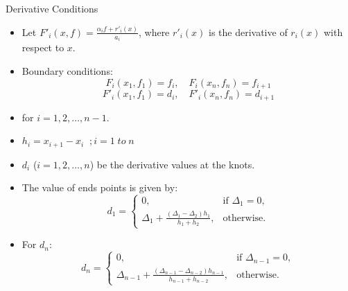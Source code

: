 \documentclass{beamer}
\begin{document}
\begin{frame}{Derivative Conditions}
    \begin{itemize}
        \item Let \( F'_i(x, f) = \frac{\alpha_i f + r'_i(x)}{a_i} \), where \( r'_i(x) \) is the derivative of \( r_i(x) \) with respect to \( x \).
        \item Boundary conditions:
        \[
        F_i(x_1, f_1) = f_i, \quad F_i(x_n, f_n) = f_{i+1}
        \]
        \[
        F'_i(x_1, f_1) = d_i, \quad F'_i(x_n, f_n) = d_{i+1}
        \]
        \item for \( i = 1, 2, \ldots, n - 1 \).
        \item \(h_i=x_{i+1}-x_i\;\;;i=1\;to\; n\)
        \item  \( d_i \) (\(i = 1, 2, \ldots, n\)) be the derivative values at the knots.
    \end{itemize}
    
        \begin{itemize}
        \item The value of ends points is given by:
        \[
        d_1 =
        \begin{cases}
            0, & \text{if } \Delta_1 = 0, \\
            \Delta_1 + \frac{(\Delta_1 - \Delta_2) h_1}{h_1 + h_2}, & \text{otherwise}.
        \end{cases}
        \]
    \end{itemize}
        \begin{itemize}
        \item For \( d_n \):
        \[
       d_n =
        \begin{cases}
            0, & \text{if } \Delta_{n-1} = 0, \\
            \Delta_{n-1} + \frac{(\Delta_{n-1} - \Delta_{n-2}) h_{n-1}}{h_{n-1} + h_{n-2}}, & \text{otherwise}.
        \end{cases}
        \]
    \end{itemize}
    
    
\end{frame}
\end{document}
